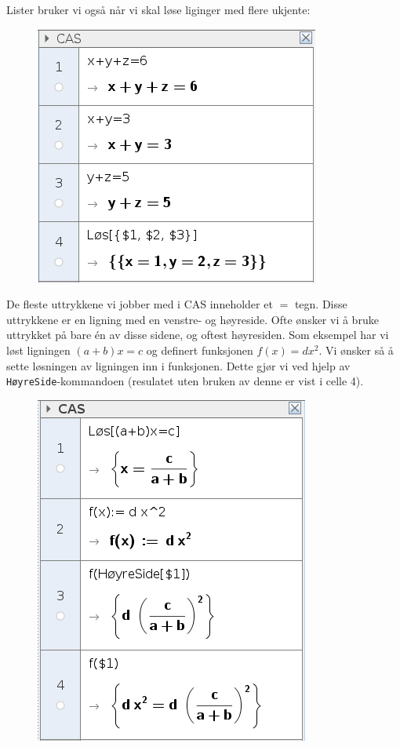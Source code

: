 Lister bruker vi også når vi skal løse liginger med flere ukjente:
\begin{figure}
	\centering
	\includegraphics[scale=0.5]{fig/lign}
\end{figure}
De fleste uttrykkene vi jobber med i CAS inneholder et $ = $ tegn. Disse uttrykkene er en ligning med en venstre- og høyreside. Ofte ønsker vi å bruke uttrykket på bare én av disse sidene, og oftest høyresiden. Som eksempel har vi løst ligningen $ (a+b)x = c $ og definert funksjonen $ f(x)= d x^2 $. Vi ønsker så å sette løsningen av ligningen inn i funksjonen. Dette gjør vi ved hjelp av \texttt{HøyreSide}-kommandoen (resulatet uten bruken av denne er vist i celle 4).
\begin{figure}
	\centering
	\includegraphics[scale=0.5]{fig/hoyre}
\end{figure}
